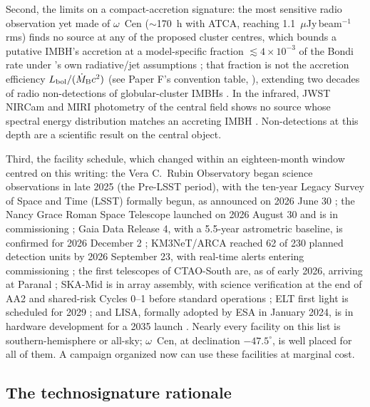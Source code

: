 \documentclass[11pt]{article}
\newcommand{\ocen}{\ensuremath{\omega}~Cen}
\begin{document}
Second, the limits on a compact-accretion signature: the most sensitive radio observation yet made of \ocen{} ($\sim$170~h with ATCA, reaching 1.1~$\mu$Jy\,beam$^{-1}$ rms) finds no source at any of the proposed cluster centres, which bounds a putative IMBH's accretion at a model-specific fraction $\lesssim 4\times10^{-3}$ of the Bondi rate under \citeauthor{Mahida2026}'s own radiative/jet assumptions \citep{Mahida2026}; that fraction is not the accretion efficiency $L_{\rm bol}/(\dot M_{\rm B}c^{2})$ (see Paper F's convention table, \citealt{Swanson2026Accretion}), extending two decades of radio non-detections of globular-cluster IMBHs \citep{Strader2012,Tremou2018}. In the infrared, JWST NIRCam and MIRI photometry of the central field shows no source whose spectral energy distribution matches an accreting IMBH \citep{Chen2025JWST}. Non-detections at this depth are a scientific result on the central object.

Third, the facility schedule, which changed within an eighteen-month window centred on this writing: the Vera C.\ Rubin Observatory began science observations in late 2025 (the Pre-LSST period), with the ten-year Legacy Survey of Space and Time (LSST) formally begun, as announced on 2026 June 30 \citep{Ivezic2019,RubinLSSTStart2026}; the Nancy Grace Roman Space Telescope launched on 2026 August 30 and is in commissioning \citep{NASARoman2026}; Gaia Data Release 4, with a 5.5-year astrometric baseline, is confirmed for 2026 December 2 \citep{GaiaMission2016,GaiaDR4DPAC2026}; KM3NeT/ARCA reached 62 of 230 planned detection units by 2026 September 23, with real-time alerts entering commissioning \citep{AdrianMartinez2016,KM3NeT2025,KM3NeTstatus2026}; the first telescopes of CTAO-South are, as of early 2026, arriving at Paranal \citep{CTAConsortium2019}; SKA-Mid is in array assembly, with science verification at the end of AA2 and shared-risk Cycles 0--1 before standard operations \citep{SKAOtimeline}; ELT first light is scheduled for 2029 \citep{Davies2021}; and LISA, formally adopted by ESA in January 2024, is in hardware development for a 2035 launch \citep{Colpi2024}. Nearly every facility on this list is southern-hemisphere or all-sky; \ocen{}, at declination $-47.5^{\circ}$, is well placed for all of them. A campaign organized now can use these facilities at marginal cost.

\subsection{The technosignature rationale}
\label{sec:rationale}
\end{document}
